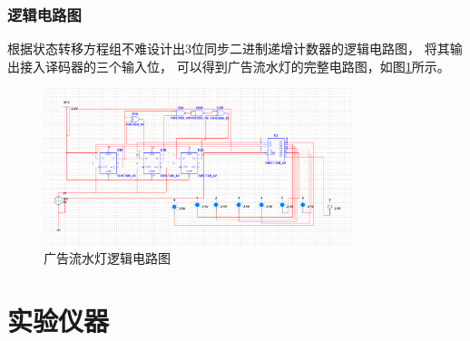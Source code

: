 \documentclass[zihao=-4]{ctexart} %
\begin{document}
\subsubsection{逻辑电路图}
根据状态转移方程组不难设计出3位同步二进制递增计数器的逻辑电路图，
将其输出接入译码器的三个输入位，
可以得到广告流水灯的完整电路图，如图\ref{fig:circuit_diagram}所示。
\begin{figure}[htbp!]
  \centering
  \includegraphics[width=0.8\textwidth]{../Ex1/img/Lab5_Ex1.png} %
  \caption{广告流水灯逻辑电路图}\label{fig:circuit_diagram}
\end{figure}
\section{实验仪器}
\end{document}
